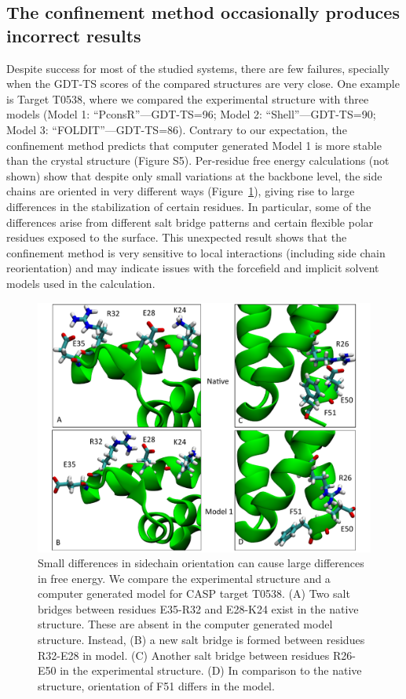 \documentclass[12pt]{article}
\begin{document}
\subsection*{The confinement method occasionally produces incorrect results}

Despite success for most of the studied systems, there are few failures, specially when the GDT-TS scores of the
compared structures are very close. One example is Target T0538, where we compared the experimental structure with three
models (Model 1: ``PconsR''---GDT-TS=96; Model 2: ``Shell''---GDT-TS=90; Model 3: ``FOLDIT''---GDT-TS=86). Contrary to
our expectation, the confinement method predicts that computer generated Model 1 is more stable than the crystal
structure (Figure S5). Per-residue free energy calculations (not shown) show that despite only small variations at the
backbone level, the side chains are oriented in very different ways (Figure~\ref{fig:T0538compare}), giving rise to
large differences in the stabilization of certain residues. In particular, some of the differences arise from different
salt bridge patterns and certain flexible polar residues exposed to the surface. This unexpected result shows that the
confinement method is very sensitive to local interactions (including side chain reorientation) and may indicate issues
with the forcefield and implicit solvent models used in the calculation.


\begin{figure}
\begin{center}
\includegraphics[width=4.9 in,height=4.0 in]{Target_538_compare.pdf}
\end{center}
\caption{Small differences in sidechain orientation can cause large differences in free energy. We compare the
    experimental structure and a computer generated model for CASP target T0538. (A) Two salt bridges between residues
    E35-R32 and E28-K24 exist in the native structure. These are absent in the computer generated model structure.
    Instead, (B) a new salt bridge is formed between residues R32-E28 in model. (C) Another salt bridge between residues
    R26-E50 in the experimental structure. (D) In comparison to the native structure, orientation of F51 differs in the
    model.}
\label{fig:T0538compare}
\end{figure}
\end{document}
